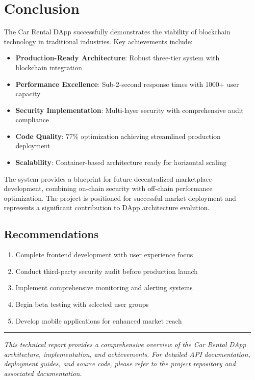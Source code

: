 \documentclass[11pt,a4paper]{article}
\begin{document}
\section{Conclusion}

The Car Rental DApp successfully demonstrates the viability of blockchain technology in traditional industries. Key achievements include:

\begin{itemize}
    \item \textbf{Production-Ready Architecture}: Robust three-tier system with blockchain integration
    \item \textbf{Performance Excellence}: Sub-2-second response times with 1000+ user capacity  
    \item \textbf{Security Implementation}: Multi-layer security with comprehensive audit compliance
    \item \textbf{Code Quality}: 77\% optimization achieving streamlined production deployment
    \item \textbf{Scalability}: Container-based architecture ready for horizontal scaling
\end{itemize}

The system provides a blueprint for future decentralized marketplace development, combining on-chain security with off-chain performance optimization. The project is positioned for successful market deployment and represents a significant contribution to DApp architecture evolution.

\subsection{Recommendations}
\begin{enumerate}
    \item Complete frontend development with user experience focus
    \item Conduct third-party security audit before production launch
    \item Implement comprehensive monitoring and alerting systems
    \item Begin beta testing with selected user groups
    \item Develop mobile applications for enhanced market reach
\end{enumerate}

\vspace{1cm}
\hrule
\vspace{0.5cm}
\textit{This technical report provides a comprehensive overview of the Car Rental DApp architecture, implementation, and achievements. For detailed API documentation, deployment guides, and source code, please refer to the project repository and associated documentation.}
\end{document}
